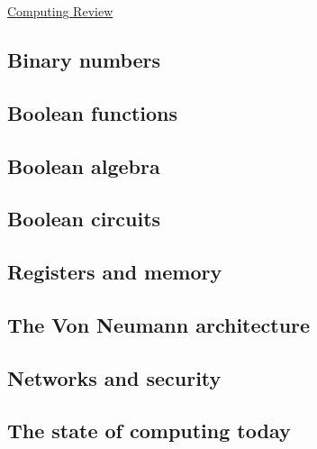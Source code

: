 \documentclass[main.tex]{subfiles}
\begin{document}
\href{https://www2.seas.gwu.edu/~simhaweb/quantum/modules/review/comp-review/comp-review.html}{Computing Review}

\subsection{Binary numbers}

\subsection{Boolean functions}

\subsection{Boolean algebra}

\subsection{Boolean circuits}

\subsection{Registers and memory}

\subsection{The Von Neumann architecture}

\subsection{Networks and security}

\subsection{The state of computing today}
\end{document}
